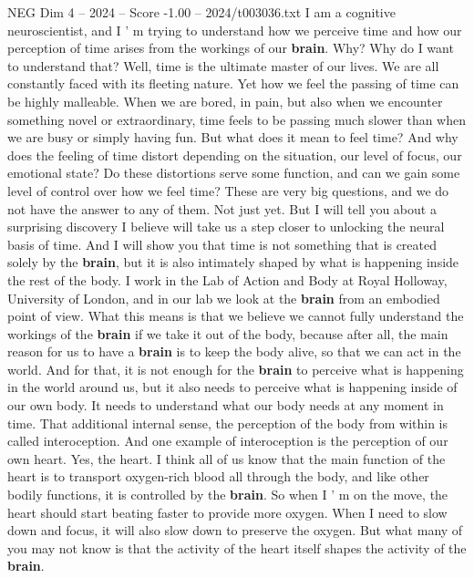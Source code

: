 \begin{textsample}{NEG Dim 4 – 2024 – Score -1.00 – 2024/t003036.txt}  \label{ex:f4_neg_073}
I am a cognitive neuroscientist, and I ' m trying to understand how we perceive time and how our perception of time arises from the workings of our \textbf{brain}.
Why?
Why do I want to understand that?
Well, time is the ultimate master of our lives.
We are all constantly faced with its fleeting nature.
Yet how we feel the passing of time can be highly malleable.
When we are bored, in pain, but also when we encounter something novel or extraordinary, time feels to be passing much slower than when we are busy or simply having fun.
But what does it mean to feel time?
And why does the feeling of time distort depending on the situation, our level of focus, our emotional state?
Do these distortions serve some function, and can we gain some level of control over how we feel time?
These are very big questions, and we do not have the answer to any of them.
Not just yet.
But I will tell you about a surprising discovery I believe will take us a step closer to unlocking the neural basis of time.
And I will show you that time is not something that is created solely by the \textbf{brain}, but it is also intimately shaped by what is happening inside the rest of the body.
I work in the Lab of Action and Body at Royal Holloway, University of London, and in our lab we look at the \textbf{brain} from an embodied point of view.
What this means is that we believe we cannot fully understand the workings of the \textbf{brain} if we take it out of the body, because after all, the main reason for us to have a \textbf{brain} is to keep the body alive, so that we can act in the world.
And for that, it is not enough for the \textbf{brain} to perceive what is happening in the world around us, but it also needs to perceive what is happening inside of our own body.
It needs to understand what our body needs at any moment in time.
That additional internal sense, the perception of the body from within is called interoception.
And one example of interoception is the perception of our own heart.
Yes, the heart.
I think all of us know that the main function of the heart is to transport oxygen-rich blood all through the body, and like other bodily functions, it is controlled by the \textbf{brain}.
So when I ' m on the move, the heart should start beating faster to provide more oxygen.
When I need to slow down and focus, it will also slow down to preserve the oxygen.
But what many of you may not know is that the activity of the heart itself shapes the activity of the \textbf{brain}.

\end{textsample}

